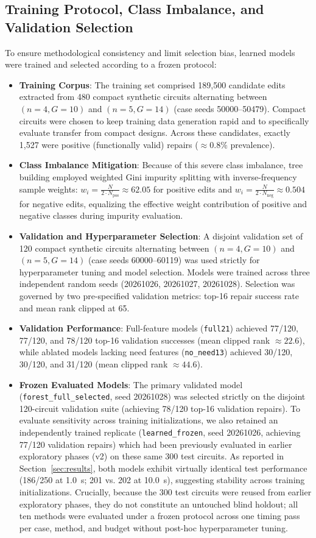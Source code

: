 \documentclass[11pt]{article}
\begin{document}
\subsection{Training Protocol, Class Imbalance, and Validation Selection}
To ensure methodological consistency and limit selection bias, learned models were trained and selected according to a frozen protocol:
\begin{itemize}
    \item \textbf{Training Corpus}: The training set comprised 189,500 candidate edits extracted from 480 compact synthetic circuits alternating between $(n=4, G=10)$ and $(n=5, G=14)$ (case seeds 50000--50479). Compact circuits were chosen to keep training data generation rapid and to specifically evaluate transfer from compact designs. Across these candidates, exactly 1,527 were positive (functionally valid) repairs ($\approx 0.8\%$ prevalence).
    \item \textbf{Class Imbalance Mitigation}: Because of this severe class imbalance, tree building employed weighted Gini impurity splitting with inverse-frequency sample weights: $w_i = \frac{N}{2 \cdot N_{\text{pos}}} \approx 62.05$ for positive edits and $w_i = \frac{N}{2 \cdot N_{\text{neg}}} \approx 0.504$ for negative edits, equalizing the effective weight contribution of positive and negative classes during impurity evaluation.
    \item \textbf{Validation and Hyperparameter Selection}: A disjoint validation set of 120 compact synthetic circuits alternating between $(n=4, G=10)$ and $(n=5, G=14)$ (case seeds 60000--60119) was used strictly for hyperparameter tuning and model selection. Models were trained across three independent random seeds (20261026, 20261027, 20261028). Selection was governed by two pre-specified validation metrics: top-16 repair success rate and mean rank clipped at 65.
    \item \textbf{Validation Performance}: Full-feature models (\texttt{full21}) achieved 77/120, 77/120, and 78/120 top-16 validation successes (mean clipped rank $\approx 22.6$), while ablated models lacking need features (\texttt{no\_need13}) achieved 30/120, 30/120, and 31/120 (mean clipped rank $\approx 44.6$).
    \item \textbf{Frozen Evaluated Models}: The primary validated model (\texttt{forest\_full\_selected}, seed 20261028) was selected strictly on the disjoint 120-circuit validation suite (achieving 78/120 top-16 validation repairs). To evaluate sensitivity across training initializations, we also retained an independently trained replicate (\texttt{learned\_frozen}, seed 20261026, achieving 77/120 validation repairs) which had been previously evaluated in earlier exploratory phases (v2) on these same 300 test circuits. As reported in Section~\ref{sec:results}, both models exhibit virtually identical test performance (186/250 at 1.0~s; 201 vs. 202 at 10.0~s), suggesting stability across training initializations. Crucially, because the 300 test circuits were reused from earlier exploratory phases, they do not constitute an untouched blind holdout; all ten methods were evaluated under a frozen protocol across one timing pass per case, method, and budget without post-hoc hyperparameter tuning.

\end{itemize}
\end{document}
